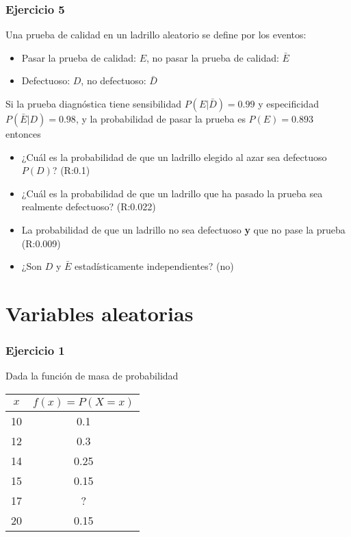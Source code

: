\documentclass[
]{book}
\providecommand{\tightlist}{%
  \setlength{\itemsep}{0pt}\setlength{\parskip}{0pt}}
\begin{document}
\hypertarget{ejercicio-5}{%
\subsubsection{Ejercicio 5}\label{ejercicio-5}}

Una prueba de calidad en un ladrillo aleatorio se define por los eventos:

\begin{itemize}
\tightlist
\item
  Pasar la prueba de calidad: \(E\), no pasar la prueba de calidad: \(\bar{E}\)
\item
  Defectuoso: \(D\), no defectuoso: \(\bar{D}\)
\end{itemize}

Si la prueba diagnóstica tiene sensibilidad \(P(E|\bar{D})=0.99\) y especificidad \(P(\bar{E}|D)=0.98\), y la probabilidad de pasar la prueba es \(P(E) =0.893\) entonces

\begin{itemize}
\item
  ¿Cuál es la probabilidad de que un ladrillo elegido al azar sea defectuoso \(P(D)\)? (R:0.1)
\item
  ¿Cuál es la probabilidad de que un ladrillo que ha pasado la prueba sea realmente defectuoso? (R:0.022)
\item
  La probabilidad de que un ladrillo no sea defectuoso \textbf{y} que no pase la prueba (R:0.009)
\item
  ¿Son \(D\) y \(\bar{E}\) estadísticamente independientes? (no)
\end{itemize}

\hypertarget{variables-aleatorias}{%
\section{Variables aleatorias}\label{variables-aleatorias}}

\hypertarget{ejercicio-1-3}{%
\subsubsection{Ejercicio 1}\label{ejercicio-1-3}}

Dada la función de masa de probabilidad

\begin{longtable}[]{@{}cc@{}}
\toprule
\(x\) & \(f(x)=P(X=x)\) \\
\midrule
\endhead
10 & 0.1 \\
12 & 0.3 \\
14 & 0.25 \\
15 & 0.15 \\
17 & ? \\
20 & 0.15 \\
\bottomrule
\end{longtable}
\end{document}
